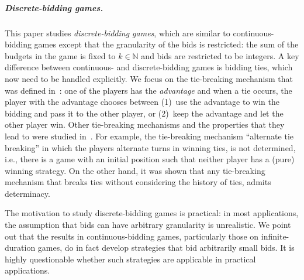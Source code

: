\documentclass{theoretics}
\newcommand{\Nat}{\mathbb{N}}
\begin{document}
\subparagraph*{Discrete-bidding games.}
This paper studies {\em discrete-bidding games}, which are similar to continuous-bidding games except that the granularity of the bids is restricted: the sum of the budgets in the game is fixed to $k \in \Nat$ and bids are restricted to be integers. A key difference between continuous- and discrete-bidding games is bidding ties, which now need to be handled explicitly. We focus on the tie-breaking mechanism that was defined in~\cite{DP10}: one of the players has the {\em advantage} and when a tie occurs, the player with the advantage chooses between (1)~use the advantage to win the bidding and pass it to the other player, or (2)~keep the advantage and let the other player win. Other tie-breaking mechanisms and the properties that they lead to were studied in~\cite{AAH21}. For example, the tie-breaking mechanism ``alternate tie breaking'' in which the players alternate turns in winning ties, is not determined, i.e., there is a game with an initial position such that neither player has a (pure) winning strategy. On the other hand, it was shown that any tie-breaking mechanism that breaks ties without considering the history of ties, admits determinacy. 




The motivation to study discrete-bidding games is practical: in most applications, the assumption that bids can have arbitrary granularity is unrealistic. We point out that the results in continuous-bidding games, particularly those on infinite-duration games, do in fact develop strategies that bid arbitrarily small bids. It is highly questionable whether such strategies are applicable in practical applications. 
\end{document}
